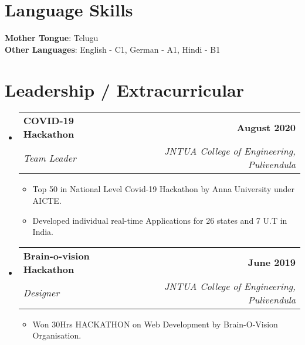 \documentclass[letterpaper,11pt]{article}
\makeatletter
\newcommand{\resumeItem}[1]{
  \item\small{
    {#1 \vspace{-2pt}}
  }
}
\newcommand{\resumeSubheading}[4]{
  \vspace{-2pt}\item
    \begin{tabular*}{1.0\textwidth}[t]{l@{\extracolsep{\fill}}r}
      \textbf{#1} & \textbf{\small #2} \\
      \textit{\small#3} & \textit{\small #4} \\
    \end{tabular*}\vspace{-7pt}
}
\newcommand{\resumeSubHeadingListStart}{\begin{itemize}[leftmargin=0.0in, label={}]}
\newcommand{\resumeSubHeadingListEnd}{\end{itemize}}
\newcommand{\resumeItemListStart}{\begin{itemize}}
\newcommand{\resumeItemListEnd}{\end{itemize}\vspace{-5pt}}
\makeatother
\begin{document}
 \section{Language Skills}
 \begin{itemize}[leftmargin=0.15in, label={}]
    \small{\item{
     \textbf{Mother Tongue}{: Telugu} \\
     \textbf{Other Languages}{: English - C1, German - A1, Hindi - B1} \\
    }}
 \end{itemize}
 \vspace{-16pt}


\section{Leadership / Extracurricular}
    \resumeSubHeadingListStart
        \resumeSubheading{COVID-19 Hackathon}{August 2020}{Team Leader}{JNTUA College of Engineering, Pulivendula}
            \resumeItemListStart
                \resumeItem{Top 50 in National Level Covid-19 Hackathon by Anna University under AICTE.}
                \resumeItem{Developed individual real-time Applications for 26 states and 7 U.T in India.}
            \resumeItemListEnd
        \resumeSubheading{Brain-o-vision Hackathon}{June 2019}{Designer}{JNTUA College of Engineering, Pulivendula}
            \resumeItemListStart
                \resumeItem{Won 30Hrs HACKATHON on Web Development by Brain-O-Vision Organisation.}
            \resumeItemListEnd
        
    \resumeSubHeadingListEnd
\end{document}
